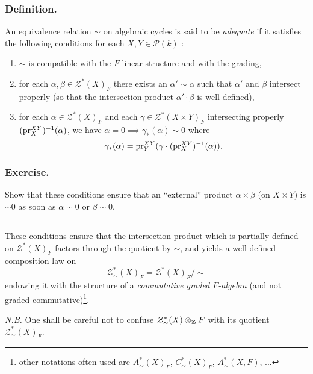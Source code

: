 \documentclass[../main.tex]{subfiles}
\begin{document}
\subsubsection{Definition.} An equivalence relation $\sim$ on algebraic cycles is said to be \emph{adequate} if it satisfies the following conditions for each $X, Y \in \mathcal{P}(k)$ :
\begin{enumerate}[label=\arabic*)]
    \item $\sim$ is compatible with the $F$-linear structure and with the grading,
    \item for each $\alpha, \beta \in \mathcal{Z}^*(X)_F$ there exists an $\alpha' \sim \alpha$ such that $\alpha'$ and $\beta$ intersect properly (so that the intersection product $\alpha' \cdot \beta$ is well-defined),
    \item for each $\alpha \in \mathcal{Z}^*(X)_F$ and each $\gamma \in \mathcal{Z}^*(X \times Y)_F$ intersecting properly $(\mathrm{pr}^{XY}_X)^{-1}(\alpha)$, we have $\alpha = 0 \implies \gamma_*(\alpha) \sim 0$ where
    $$\gamma_*(\alpha) = \mathrm{pr}^{XY}_Y(\gamma \cdot (\mathrm{pr}^{XY}_X)^{-1}(\alpha)).$$
\end{enumerate}

\subsubsection{Exercise.} Show that these conditions ensure that an \enquote{external} product $\alpha \times \beta$ (on $X \times Y$) is $\sim 0$ as soon as $\alpha \sim 0$ or $\beta \sim 0$.

\subsection{} These conditions ensure that the intersection product which is partially defined on $\mathcal{Z}^*(X)_F$ factors through the quotient by $\sim$, and yields a well-defined composition law on
$$\mathcal{Z}^*_{\sim}(X)_F = \mathcal{Z}^*(X)_F/\sim$$
endowing it with the structure of a \emph{commutative graded $F$-algebra} (and not graded-commutative)\footnote{other notations often used are $A^*_{\sim}(X)_F$, $C^*_{\sim}(X)_F$, $A^*_{\sim}(X, F)$, ...}.

\emph{N.B.} One shall be careful not to confuse $\mathcal{Z}^*_{\sim}(X) \otimes_{\mathbf{Z}} F$ with its quotient $\mathcal{Z}^*_{\sim}(X)_F$.
\end{document}
